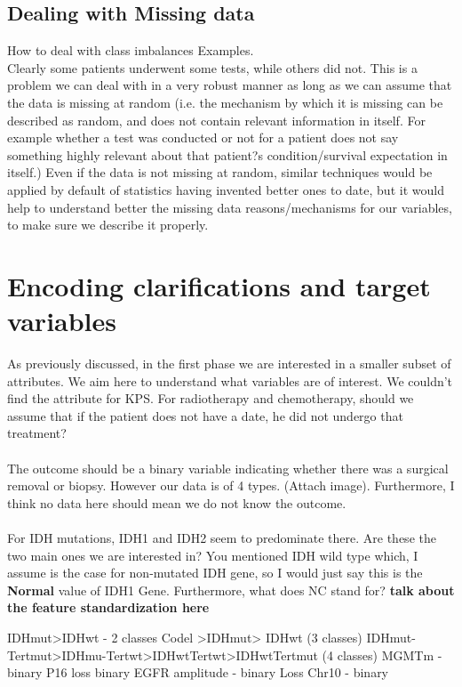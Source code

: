 \documentclass[a4paper]{article}
\begin{document}
\subsection{Dealing with Missing data}
How to deal with class imbalances
Examples. \\
Clearly some patients underwent some tests, while others did not. This is a problem we can deal with in a very robust manner as long as we can assume that the data is missing at random (i.e. the mechanism by which it is missing can be described as random, and does not contain relevant information in itself. For example whether a test was conducted or not for a patient does not say something highly relevant about that patient?s condition/survival expectation in itself.) Even if the data is not missing at random, similar techniques would be applied by default of statistics having invented better ones to date, but it would help to understand better the missing data reasons/mechanisms for our variables, to make sure we describe it properly.


\section{Encoding clarifications and target variables}
As previously discussed, in the first phase we are interested in a smaller subset of attributes. We aim here to understand what variables are of interest. We couldn't find the attribute for KPS. For radiotherapy and chemotherapy, should we assume that if the patient does not have a date, he did not undergo that treatment? \\
\\
The outcome should be a binary variable indicating whether there was a surgical removal or biopsy. However our data is of 4 types. (Attach image). Furthermore, I think no data here should mean we do not know the outcome. \\
\\
For IDH mutations, IDH1 and IDH2 seem to predominate there. Are these the two main ones we are interested in? You mentioned IDH wild type which, I assume is the case for non-mutated IDH gene, so I would just say this is the \textbf{Normal} value of IDH1 Gene. Furthermore, what does NC stand for?
\textbf{talk about the feature standardization here}

\subitem IDHmut>IDHwt - 2 classes
	\subitem Codel >IDHmut> IDHwt (3 classes)
	\subitem IDHmut-Tertmut>IDHmu-Tertwt>IDHwtTertwt>IDHwtTertmut (4 classes)
	\subitem MGMTm -binary
	\subitem P16 loss binary 
	\subitem EGFR amplitude - binary 
 	\subitem Loss Chr10 - binary 
\end{document}
